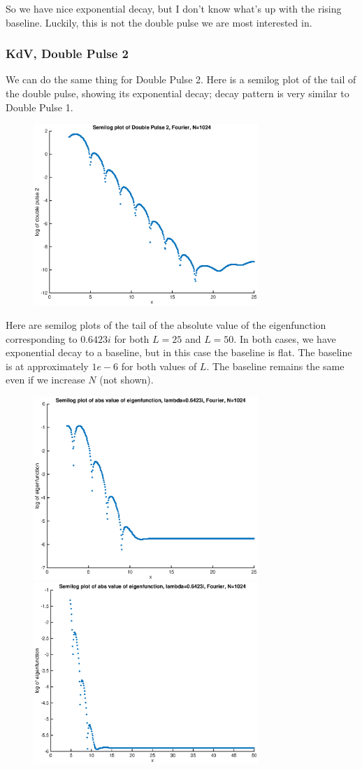 \documentclass[12pt]{article}
\begin{document}
So we have nice exponential decay, but I don't know what's up with the rising baseline. Luckily, this is not the double pulse we are most interested in.


\subsubsection*{KdV, Double Pulse 2}
We can do the same thing for Double Pulse 2. Here is a semilog plot of the tail of the double pulse, showing its exponential decay; decay pattern is very similar to Double Pulse 1.
\begin{figure}[H]
\includegraphics[width=8.5cm]{2doublesemilog}
\end{figure}

Here are semilog plots of the tail of the absolute value of the eigenfunction corresponding to $0.6423i$ for both $L = 25$ and $L = 50$. In both cases, we have exponential decay to a baseline, but in this case the baseline is flat. The baseline is at approximately $1e-6$ for both values of $L$. The baseline remains the same even if we increase $N$ (not shown).
\begin{figure}[H]
\includegraphics[width=8.5cm]{2doublesemilogeigenfn}
\includegraphics[width=8.5cm]{2doublesemilogeigenfn50}
\end{figure}
\end{document}
